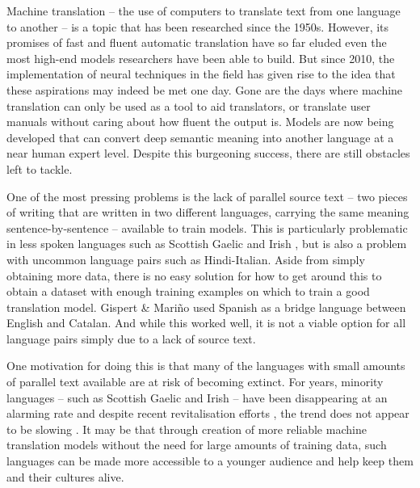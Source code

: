 \documentclass[11pt]{article}
\begin{document}
Machine translation -- the use of computers to translate text from one language to another -- is a topic that has been researched since the 1950s. However, its promises of fast and fluent automatic translation have so far eluded even the most high-end models researchers have been able to build. But since 2010, the implementation of neural techniques in the field has given rise to the idea that these aspirations may indeed be met one day. Gone are the days where machine translation can only be used as a tool to aid translators, or translate user manuals without caring about how fluent the output is. Models are now being developed that can convert deep semantic meaning into another language at a near human expert level. Despite this burgeoning success, there are still obstacles left to tackle.

\bigskip

One of the most pressing problems is the lack of parallel source text -- two pieces of writing that are written in two different languages, carrying the same meaning sentence-by-sentence -- available to train models. This is particularly problematic in less spoken languages such as Scottish Gaelic and Irish \citep{gaelic}, but is also a problem with uncommon language pairs such as Hindi-Italian. Aside from simply obtaining more data, there is no easy solution for how to get around this to obtain a dataset with enough training examples on which to train a good translation model. Gispert \& Mariño \citeyearpar{catalan} used Spanish as a bridge language between English and Catalan. And while this worked well, it is not a viable option for all language pairs simply due to a lack of source text. 

\bigskip

One motivation for doing this is that many of the languages with small amounts of parallel text available are at risk of becoming extinct. For years, minority languages -- such as Scottish Gaelic and Irish -- have been disappearing at an alarming rate \citep{ostler1999disappearing} and despite recent revitalisation efforts \citep{gaelic-language-plan, irish-language-plan}, the trend does not appear to be slowing \citep{thomason2015endangered}. It may be that through creation of more reliable machine translation models without the need for large amounts of training data, such languages can be made more accessible to a younger audience and help keep them and their cultures alive.

\bigskip
\end{document}
